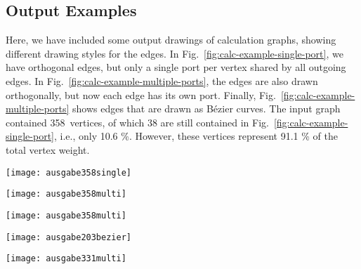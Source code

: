 \documentclass[]{llncs}
\begin{document}
\subsection{Output Examples}
\label{app:calc-examples}

Here, we have included some output drawings of calculation graphs,
showing different drawing styles for the edges. In
Fig.~\ref{fig:calc-example-single-port}, we have orthogonal edges, but
only a single port per vertex shared by all outgoing edges. In
Fig.~\ref{fig:calc-example-multiple-ports}, the edges are also drawn
orthogonally, but now each edge has its own port. Finally,
Fig.~\ref{fig:calc-example-multiple-ports} shows edges that are drawn
as B\'ezier curves. The input graph contained 358~vertices, of which
38 are still contained in Fig.~\ref{fig:calc-example-single-port},
i.e., only 10.6 \%. However, these vertices represent 91.1 \% of the
total vertex weight.

\begin{sidewaysfigure}[htbp]
\centering
  \texttt{[image: ausgabe358single]}
  \caption{Orthogonal edges with a single port per vertex.}
	\label{fig:calc-example-single-port}
\end{sidewaysfigure}

\begin{sidewaysfigure}[htbp]
\centering
  \texttt{[image: ausgabe358multi]}
  \caption{Orthogonal edges with an own port for each outgoing edge.}
	\label{fig:calc-example-multiple-ports}
\end{sidewaysfigure}

\begin{sidewaysfigure}[htbp]
\centering
  \texttt{[image: ausgabe358multi]}
  \caption{Edges drawing as B\'ezier curves; except for the edge
    style, the drawing is the same as in
    Fig.~\ref{fig:calc-example-multiple-ports}.}
	\label{fig:calc-example-bezier}
\end{sidewaysfigure}




\begin{sidewaysfigure}[htbp]
\centering
  \texttt{[image: ausgabe203bezier]}
  \caption{Output drawing for a graph with 203 vertices; contained
	vertices: 22.1 \%; contained vertex weight: 95,2 \%; contained
edges: 22.0 \%; contained edge weight: 94,0 \%}
\end{sidewaysfigure}



\begin{sidewaysfigure}[htbp]
\centering
  \texttt{[image: ausgabe331multi]}
  \caption{Output drawing for a graph with 331 vertices; contained
	vertices: 13,9 \%; contained vertex weight: 92,9 \%; contained
edges: 11,4 \%; contained edge weight: 89,6 \%}
\end{sidewaysfigure}
\end{document}
